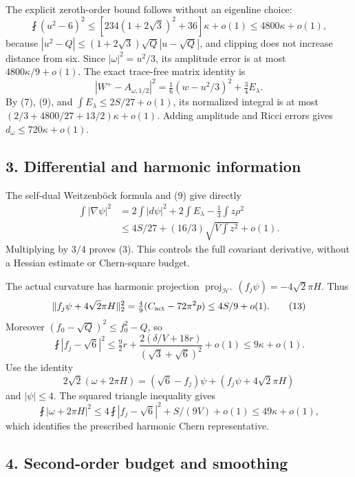 \documentclass[
  11pt,
]{article}
\begin{document}
The explicit zeroth-order bound follows without an eigenline choice: \[
 \fint(u^2-6)^2
 \le[234(1+2\sqrt3)^2+36]\kappa+o(1)
 \le4800\kappa+o(1),
 \tag{10}
\] because \(|u^2-Q|\le(1+2\sqrt3)\sqrt Q|u-\sqrt Q|\), and clipping
does not increase distance from six. Since \(|\omega|^2=u^2/3\), its
amplitude error is at most \(4800\kappa/9+o(1)\). The exact trace-free
matrix identity is \[
 |W^+-A_{\omega,1/2}|^2
 =\tfrac16(w-u^2/3)^2+\tfrac34 E_\lambda.
 \tag{11}
\] By (7), (9), and \(\int E_\lambda\le2S/27+o(1)\), its normalized
integral is at most \((2/3+4800/27+13/2)\kappa+o(1)\). Adding amplitude
and Ricci errors gives \(d_\omega\le720\kappa+o(1)\).

\hypertarget{differential-and-harmonic-information}{%
\subsection{3. Differential and harmonic
information}\label{differential-and-harmonic-information}}

The self-dual Weitzenböck formula and (9) give directly \[
 \begin{split}
 \int|\nabla\psi|^2
 &=2\int|d\psi|^2+2\int E_\lambda-\tfrac13\int z\rho^2\\
 &\le4S/27+(16/3)\sqrt{V\int z^2}+o(1).
 \end{split}
 \tag{12}
\] Multiplying by \(3/4\) proves (3). This controls the full covariant
derivative, without a Hessian estimate or Chern-square budget.

The actual curvature has harmonic projection
\(\operatorname{proj}_{\mathcal H^+}(f_j\psi)=-4\sqrt2\pi H\). Thus \[
 \|f_j\psi+4\sqrt2\pi H\|_2^2
 =\tfrac49(C_{\rm act}-72\pi^2p)\le4S/9+o(1).
 \tag{13}
\] Moreover \((f_0-\sqrt Q)^2\le f_0^2-Q\), so \[
 \fint|f_j-\sqrt6|^2
 \le\tfrac92r+
 \frac{2(\delta/V+18r)}{(\sqrt3+\sqrt6)^2}+o(1)
 \le9\kappa+o(1).
 \tag{14}
\] Use the identity \[
 2\sqrt2(\omega+2\pi H)
 =(\sqrt6-f_j)\psi+(f_j\psi+4\sqrt2\pi H)
\] and \(|\psi|\le4\). The squared triangle inequality gives \[
 \fint|\omega+2\pi H|^2
 \le4\fint|f_j-\sqrt6|^2+S/(9V)+o(1)
 \le49\kappa+o(1),
 \tag{15}
\] which identifies the prescribed harmonic Chern representative.

\hypertarget{second-order-budget-and-smoothing}{%
\subsection{4. Second-order budget and
smoothing}\label{second-order-budget-and-smoothing}}
\end{document}
